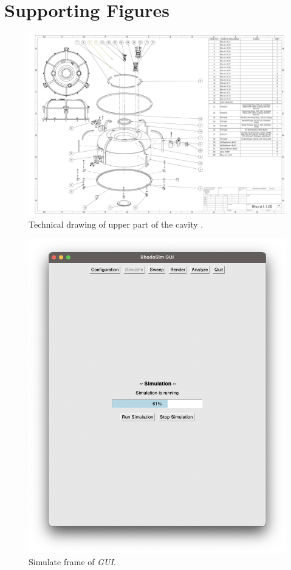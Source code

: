 \documentclass[a4paper,oneside,12pt]{report}
\numberwithin{equation}{chapter}
\begin{document}
{\chapter{Supporting Figures} \label{appendix:supp}
\begin{figure}[H]
    \centering
    \includegraphics[angle=270,origin=c, width=.8\linewidth]{./figures/teknikcizim/Rho-A1.1.00.pdf}
    \vspace{20pt}
    \caption{Technical drawing of upper part of the cavity \cite{sinan}.}
    \label{fig:techd_up}
\end{figure}

\begin{figure}
    \centering
    \includegraphics[width=\linewidth]{./figures/rhodoSim/GUI_simulation_frame.png}
    \caption{Simulate frame of \textit{GUI}.}
    \label{fig:gui_simulate_1}
\end{figure}

}
\end{document}
